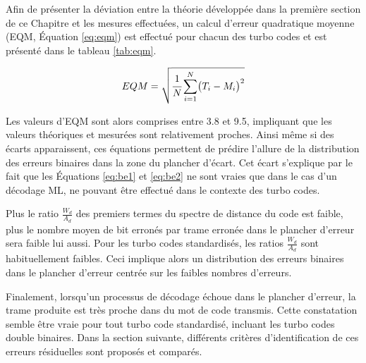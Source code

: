 Afin de présenter la déviation entre la théorie développée dans la première section de ce Chapitre et les mesures 
effectuées, un calcul d'erreur quadratique moyenne (EQM, Équation \ref{eq:eqm}) est effectué pour chacun des turbo codes 
et est présenté dans le tableau \ref{tab:eqm}.

\begin{equation}
	EQM = \sqrt{\cfrac{1}{N}\sum\limits_{i=1}^N\bigl(T_i-M_i\bigr)^2}
	\label{eq:eqm}
\end{equation}

Les valeurs d'EQM sont alors comprises entre 3.8 et 9.5, impliquant que les valeurs théoriques et mesurées sont 
relativement proches. Ainsi même si des écarts apparaissent, ces équations permettent de prédire l'allure de la distribution
des erreurs binaires dans la zone du plancher d'écart. Cet écart s'explique par le fait que les Équations \ref{eq:be1} 
et \ref{eq:be2} ne sont vraies que dans le cas d'un décodage ML, ne pouvant être effectué dans le contexte des turbo codes.

Plus le ratio $\frac{W_d}{A_d}$ des premiers termes du spectre de distance du code est faible, plus le nombre moyen de 
bit erronés par trame erronée dans le plancher d'erreur sera faible lui aussi. Pour les turbo codes 
standardisés, les ratios $\frac{W_d}{A_d}$ sont habituellement faibles. Ceci implique alors un distribution des erreurs 
binaires dans le plancher d'erreur centrée sur les faibles nombres d'erreurs.
\begin{table}[b]
\centering
\caption{Erreur quadratique moyenne entre théorie et simulations Monte-Carlo}
\label{tab:eqm}
\end{table}

Finalement, lorsqu'un processus de décodage échoue dans le plancher d'erreur, la trame produite est très proche dans du 
mot de code transmis. Cette constatation semble être vraie pour tout turbo code standardisé, incluant les turbo codes
double binaires. Dans la section suivante, différents critères d'identification de ces erreurs résiduelles sont 
proposés et comparés.
\newpage
